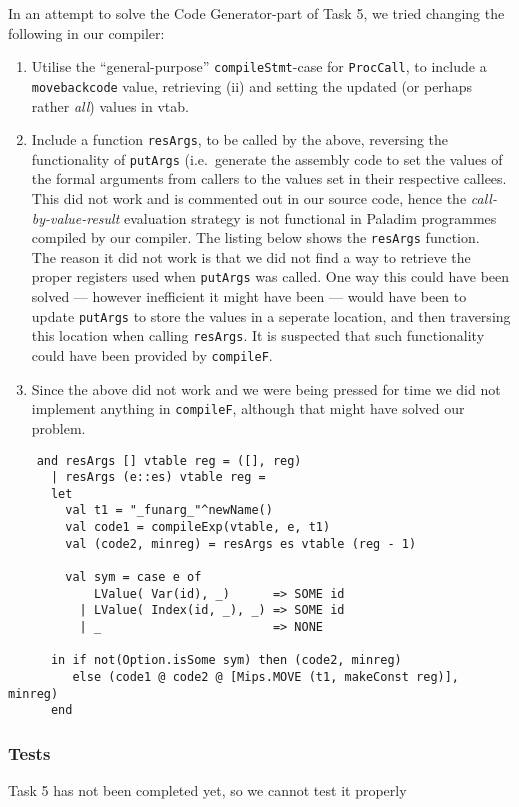 \documentclass[11pt]{article}
\begin{document}
In an attempt to solve the Code Generator-part of Task 5, we tried changing the
following in our compiler:
\begin{enumerate}[i]
    \item Utilise the ``general-purpose'' {\tt compileStmt}-case for {\tt ProcCall},
        to include a {\tt movebackcode} value, retrieving (ii) and
        setting the updated (or perhaps rather {\it all}\/) values in vtab.
    \item Include a function {\tt resArgs}, to be called by the above, reversing
        the functionality of {\tt putArgs} (i.e.\ generate the assembly code to
        set the values of the formal arguments from callers to the values set
        in their respective callees.\\
        This did not work and is commented out in our source code, hence the
        {\it call-by-value-result}\/ evaluation strategy is not functional in
        Paladim programmes compiled by our compiler. The listing below shows
        the {\tt resArgs} function.\\
        The reason it did not work is that we did not find a way to retrieve
        the proper registers used when {\tt putArgs} was called. One way this
        could have been solved --- however inefficient it might have been ---
        would have been to update {\tt putArgs} to store the values in a
        seperate location, and then traversing this location when calling
        {\tt resArgs}. It is suspected that such functionality could have
        been provided by {\tt compileF}.
    \item Since the above did not work and we were being pressed for time
        we did not implement anything in {\tt compileF}, although that might
        have solved our problem.
\end{enumerate} 

\begin{lstlisting}
    and resArgs [] vtable reg = ([], reg)
      | resArgs (e::es) vtable reg =
      let
        val t1 = "_funarg_"^newName()
        val code1 = compileExp(vtable, e, t1)
        val (code2, minreg) = resArgs es vtable (reg - 1)

        val sym = case e of 
            LValue( Var(id), _)      => SOME id
          | LValue( Index(id, _), _) => SOME id
          | _                        => NONE
      
      in if not(Option.isSome sym) then (code2, minreg)
         else (code1 @ code2 @ [Mips.MOVE (t1, makeConst reg)], minreg)
      end
\end{lstlisting}

\subsubsection*{Tests}
Task 5 has not been completed yet, so we cannot test it properly 
\end{document}
